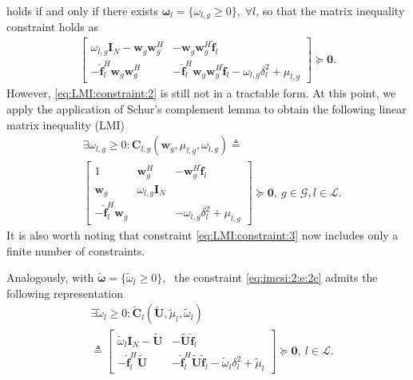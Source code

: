 \documentclass[journal,twoside]{IEEEtran}
\begin{document}
holds if and only if there exists $\boldsymbol{\omega}_{l}=\{\omega_{l,g}\geq 0\},\;\forall l$, so that the matrix inequality constraint holds as 
\begin{equation}\begin{aligned}
\begin{bmatrix}
    \omega_{l,g}\mathbf{I}_N-\mathbf{w}_g\mathbf{w}_g^H & -\mathbf{w}_g\mathbf{w}_g^H\mathbf{\hat{f}}_l\\
    -\mathbf{\hat{f}}_l^{H}\mathbf{w}_g\mathbf{w}_g^H & -\mathbf{\hat{f}}_l^{H}\mathbf{w}_g\mathbf{w}_g^H\mathbf{\hat{f}}_l-\omega_{l,g}\delta_l^2+\mu_{l,g}
 \end{bmatrix}
\succeq\mathbf{0}.
\end{aligned}\label{eq:LMI:constraint:2}\end{equation}
However, \eqref{eq:LMI:constraint:2} is still not in a tractable form. At this point, we apply the application of Schur's complement lemma \cite[Eq.~(7.2.6)]{Tal:09} to obtain the following linear matrix inequality (LMI)
\begin{equation}\begin{aligned}
&\exists \omega_{l,g} \geq 0: \mathbf{C}_{l,g}(\mathbf{w}_g,\mu_{l,g},\omega_{l,g})\triangleq\\
&\begin{bmatrix}
    1 &     \mathbf{w}_g^H      &-\mathbf{w}_g^H\mathbf{\hat{f}}_l\\
		\mathbf{w}_g                                                    &  \omega_{l,g}\mathbf{I}_N  &                                                    \\
    -\mathbf{\hat{f}}_l^{H}\mathbf{w}_g & &-\omega_{l,g}\delta_l^2+\mu_{l,g}
 \end{bmatrix}
\succeq\mathbf{0},\ g\in\mathcal{G}, l\in\mathcal{L}.
\end{aligned}\label{eq:LMI:constraint:3}\end{equation}
It is also worth noting that constraint \eqref{eq:LMI:constraint:3} now includes only a finite number of constraints. 

Analogously, with $\tilde{\boldsymbol{\omega}}=\{\tilde{\omega}_{l}\geq 0\},\;$ the constraint \eqref{eq:imcsi:2:e:2c} admits the following representation
\begin{equation}\begin{aligned}
&\exists \tilde{\omega}_l \geq 0: \tilde{\mathbf{C}}_{l}(\widetilde{\mathbf{U}},\tilde{\mu}_{l},\tilde{\omega}_{l})\\
&\triangleq\begin{bmatrix}
    \tilde{\omega}_{l}\mathbf{I}_N - \widetilde{\mathbf{U}} &- \widetilde{\mathbf{U}}\mathbf{\hat{f}}_l\\
		-\mathbf{\hat{f}}_l^{H} \widetilde{\mathbf{U}} &-\mathbf{\hat{f}}_l^{H} \widetilde{\mathbf{U}}\mathbf{\hat{f}}_l-\tilde{\omega}_{l}\delta_l^2+\tilde{\mu}_{l}
 \end{bmatrix}
\succeq\mathbf{0},\ l\in\mathcal{L}.
\end{aligned}\label{eq:LMI:constraint:4}\end{equation}
\end{document}
